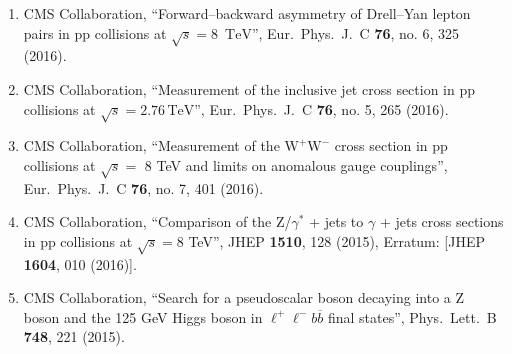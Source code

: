 \begin{itemize}
\begin{enumerate}
\item CMS Collaboration, ``Forward–backward asymmetry of Drell–Yan lepton pairs in pp collisions at $\sqrt{s} = 8$ $\,\mathrm{TeV}$'', Eur.\ Phys.\ J.\ C {\bf 76}, no. 6, 325 (2016).

\item CMS Collaboration, ``Measurement of the inclusive jet cross section in pp collisions at $\sqrt{s} = 2.76\,\text {TeV}$'', Eur.\ Phys.\ J.\ C {\bf 76}, no. 5, 265 (2016).

\item CMS Collaboration, ``Measurement of the ${{\mathrm{W} }^{+} }\mathrm{W}^{-} $ cross section in pp collisions at $\sqrt{s} =$ 8 TeV and limits on anomalous gauge couplings'', Eur.\ Phys.\ J.\ C {\bf 76}, no. 7, 401 (2016).

\item CMS Collaboration, ``Comparison of the Z/$\gamma$$^{*}$ + jets to $\gamma$ + jets cross sections in pp collisions at $ \sqrt{s}=8 $ TeV'', JHEP {\bf 1510}, 128 (2015), Erratum: [JHEP {\bf 1604}, 010 (2016)].


\item CMS Collaboration, ``Search for a pseudoscalar boson decaying into a Z boson and the 125 GeV Higgs boson in $\ell^+\ell^-b\overline{b}$ final states'', Phys.\ Lett.\ B {\bf 748}, 221 (2015).


\end{enumerate}
\end{itemize}
